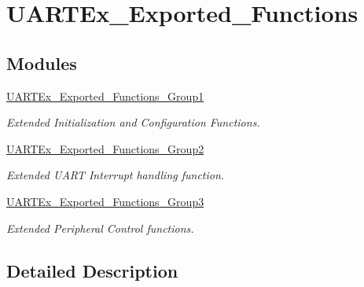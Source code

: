 \hypertarget{group___u_a_r_t_ex___exported___functions}{}\section{U\+A\+R\+T\+Ex\+\_\+\+Exported\+\_\+\+Functions}
\label{group___u_a_r_t_ex___exported___functions}
\subsection*{Modules}
\begin{DoxyCompactItemize}
\item 
\hyperlink{group___u_a_r_t_ex___exported___functions___group1}{U\+A\+R\+T\+Ex\+\_\+\+Exported\+\_\+\+Functions\+\_\+\+Group1}
\begin{DoxyCompactList}\small\item\em Extended Initialization and Configuration Functions. \end{DoxyCompactList}\item 
\hyperlink{group___u_a_r_t_ex___exported___functions___group2}{U\+A\+R\+T\+Ex\+\_\+\+Exported\+\_\+\+Functions\+\_\+\+Group2}
\begin{DoxyCompactList}\small\item\em Extended U\+A\+RT Interrupt handling function. \end{DoxyCompactList}\item 
\hyperlink{group___u_a_r_t_ex___exported___functions___group3}{U\+A\+R\+T\+Ex\+\_\+\+Exported\+\_\+\+Functions\+\_\+\+Group3}
\begin{DoxyCompactList}\small\item\em Extended Peripheral Control functions. \end{DoxyCompactList}\end{DoxyCompactItemize}


\subsection{Detailed Description}
